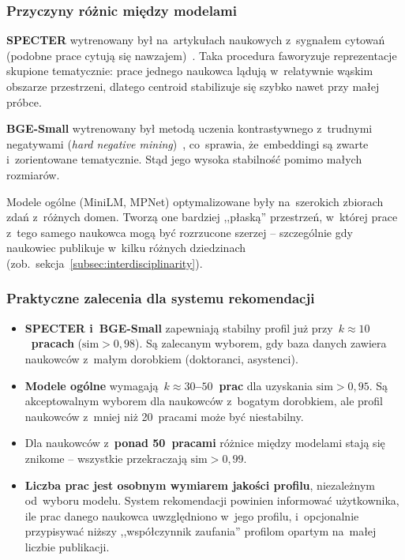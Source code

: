 \subsubsection{Przyczyny różnic między modelami}

\textbf{SPECTER} wytrenowany był na~artykułach naukowych
z~sygnałem cytowań (podobne prace cytują się nawzajem)~\cite{specter2020}.
Taka procedura faworyzuje reprezentacje skupione tematycznie:
prace jednego naukowca lądują w~relatywnie wąskim obszarze przestrzeni,
dlatego centroid stabilizuje się szybko nawet przy małej próbce.

\textbf{BGE-Small} wytrenowany był metodą uczenia kontrastywnego
z~trudnymi negatywami (\textit{hard negative mining})~\cite{bge2023},
co~sprawia, że~embeddingi są zwarte i~zorientowane tematycznie.
Stąd jego wysoka stabilność pomimo małych rozmiarów.

Modele ogólne (MiniLM, MPNet) optymalizowane były na~szerokich
zbiorach zdań z~różnych domen.
Tworzą one bardziej ,,płaską'' przestrzeń, w~której prace
z~tego samego naukowca mogą być rozrzucone szerzej --
szczególnie gdy naukowiec publikuje w~kilku różnych dziedzinach
(zob.\ sekcja~\ref{subsec:interdisciplinarity}).

\subsubsection{Praktyczne zalecenia dla systemu rekomendacji}

\begin{itemize}
    \item \textbf{SPECTER i~BGE-Small} zapewniają stabilny profil już
    przy~\textbf{$k \approx 10$~pracach} ($\mathrm{sim} > 0{,}98$).
    Są zalecanym wyborem, gdy baza danych zawiera naukowców
    z~małym dorobkiem (doktoranci, asystenci).

    \item \textbf{Modele ogólne} wymagają~\textbf{$k \approx 30$--$50$~prac}
    dla uzyskania $\mathrm{sim} > 0{,}95$.
    Są akceptowalnym wyborem dla naukowców z~bogatym dorobkiem,
    ale profil naukowców z~mniej niż 20~pracami może być niestabilny.

    \item Dla naukowców z~\textbf{ponad 50~pracami} różnice między modelami
    stają się znikome -- wszystkie przekraczają $\mathrm{sim} > 0{,}99$.

    \item \textbf{Liczba prac jest osobnym wymiarem jakości profilu},
    niezależnym od~wyboru modelu.
    System rekomendacji powinien informować użytkownika,
    ile prac danego naukowca uwzględniono w~jego profilu,
    i~opcjonalnie przypisywać niższy ,,współczynnik zaufania''
    profilom opartym na~małej liczbie publikacji.
\end{itemize}
